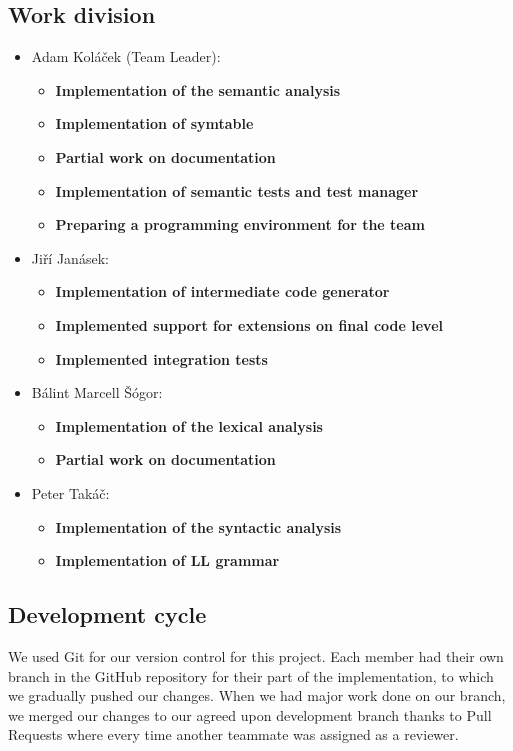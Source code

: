 \documentclass[a4paper]{article}
\begin{document}
\subsection{Work division}
\begin{itemize}
  \item Adam Koláček (Team Leader):
  \begin{itemize}
    \item[--] \textbf{Implementation of the semantic analysis}
    \item[--] \textbf{Implementation of symtable}
    \item[--] \textbf{Partial work on documentation}
    \item[--] \textbf{Implementation of semantic tests and test manager}
    \item[--] \textbf{Preparing a programming environment for the team} 
  \end{itemize}
  \item Jiří Janásek:
  \begin{itemize}
    \item[--] \textbf{Implementation of intermediate code generator}
    \item[--] \textbf{Implemented support for extensions on final code level}
    \item[--] \textbf{Implemented integration tests}  
  \end{itemize}
  \item Bálint Marcell Šógor:
  \begin{itemize}
    \item[--] \textbf{Implementation of the lexical analysis}
    \item[--] \textbf{Partial work on documentation}
  \end{itemize}
  \item Peter Takáč:
  \begin{itemize}
    \item[--] \textbf{Implementation of the syntactic analysis }
    \item[--] \textbf{Implementation of LL grammar}
  \end{itemize}
\end{itemize}

\subsection{Development cycle}
We used Git for our version control for this project.
Each member had their own branch in the GitHub repository for their part of the implementation,
to which we gradually pushed our changes. When we had major work done on our branch, we merged our changes
to our agreed upon development branch thanks to Pull Requests where every time another teammate was assigned as a reviewer.
\end{document}
